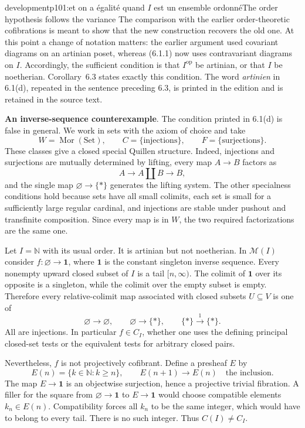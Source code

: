 \begin{dcomment}{development}{p101:et on a égalité quand $I$ est un ensemble ordonné}{The order hypothesis follows the variance}
The comparison with the earlier order-theoretic cofibrations is meant to show that the new construction recovers the old one. At this point a change of notation matters: the earlier argument used covariant diagrams on an artinian poset, whereas (6.1.1) now uses contravariant diagrams on $I$. Accordingly, the sufficient condition is that $I^{\mathrm{op}}$ be artinian, or that $I$ be noetherian. Corollary~6.3 states exactly this condition. The word \emph{artinien} in 6.1(d), repeated in the sentence preceding 6.3, is printed in the edition and is retained in the source text.

\textbf{An inverse-sequence counterexample}\ours.
The condition printed in 6.1(d) is false in general. We work in sets with the axiom of choice and take
\[
 W=\operatorname{Mor}(\mathrm{Set}),\qquad
 C=\{\text{injections}\},\qquad F=\{\text{surjections}\}.
\]
These classes give a closed special Quillen structure. Indeed, injections and surjections are mutually determined by lifting, every map $A\to B$ factors as
\[
 A\longrightarrow A\amalg B\longrightarrow B,
\]
and the single map $\varnothing\to\{*\}$ generates the lifting system. The other specialness conditions hold because sets have all small colimits, each set is small for a sufficiently large regular cardinal, and injections are stable under pushout and transfinite composition. Since every map is in $W$, the two required factorizations are the same one.

Let $I=\mathbb N$ with its usual order. It is artinian but not noetherian. In $\mathcal M(I)$ consider $f:\varnothing\to\mathbf1$, where $\mathbf1$ is the constant singleton inverse sequence. Every nonempty upward closed subset of $I$ is a tail $[n,\infty)$. The colimit of $\mathbf1$ over its opposite is a singleton, while the colimit over the empty subset is empty. Therefore every relative-colimit map associated with closed subsets $U\subseteq V$ is one of
\[
 \varnothing\longrightarrow\varnothing,\qquad
 \varnothing\longrightarrow\{*\},\qquad
 \{*\}\xrightarrow{1}\{*\}.
\]
All are injections. In particular $f\in C_I$, whether one uses the defining principal closed-set tests or the equivalent tests for arbitrary closed pairs.

Nevertheless, $f$ is not projectively cofibrant. Define a presheaf $E$ by
\[
 E(n)=\{k\in\mathbb N:k\geq n\},\qquad
 E(n+1)\longrightarrow E(n)
 \quad\text{the inclusion}.
\]
The map $E\to\mathbf1$ is an objectwise surjection, hence a projective trivial fibration. A filler for the square from $\varnothing\to\mathbf1$ to $E\to\mathbf1$ would choose compatible elements $k_n\in E(n)$. Compatibility forces all $k_n$ to be the same integer, which would have to belong to every tail. There is no such integer. Thus $C(I)\ne C_I$.


\end{dcomment}
